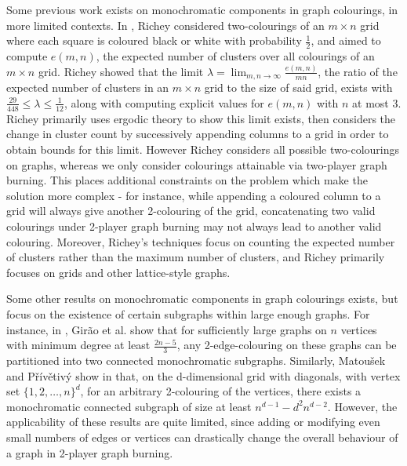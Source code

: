 \documentclass{mprop}
\begin{document}
Some previous work exists on monochromatic components in graph colourings, in more limited contexts. In \cite{richey_counting_nodate}, Richey considered two-colourings of an $m \times n$ grid where each square is coloured black or white with probability $\frac{1}{2}$, and aimed to compute $e(m,n)$, the expected number of clusters over all colourings of an $m \times n$ grid. Richey showed that the limit $\lambda = \lim_{m, n \rightarrow \infty} \frac{e(m, n)}{mn}$, the ratio of the expected number of clusters in an $m \times n$ grid to the size of said grid, exists with $\frac{29}{448} \leq \lambda \leq \frac{1}{12}$, along with computing explicit values for $e(m,n)$ with $n$ at most 3. Richey primarily uses ergodic theory to show this limit exists, then considers the change in cluster count by successively appending columns to a grid in order to obtain bounds for this limit. However Richey considers all possible two-colourings on graphs, whereas we only consider colourings attainable via two-player graph burning. This places additional constraints on the problem which make the solution more complex - for instance, while appending a coloured column to a grid will always give another 2-colouring of the grid, concatenating two valid colourings under 2-player graph burning may not always lead to another valid colouring. Moreover, Richey's techniques focus on counting the expected number of clusters rather than the maximum number of clusters, and Richey primarily focuses on grids and other lattice-style graphs.

Some other results on monochromatic components in graph colourings exists, but focus on the existence of certain subgraphs within large enough graphs. For instance, in \cite{girao_partitioning_2019}, Gir\~ao et al. show that for sufficiently large graphs on $n$ vertices with minimum degree at least $\frac{2n-5}{3}$, any 2-edge-colouring on these graphs can be partitioned into two connected monochromatic subgraphs. Similarly, Matou\v sek and P\v r\'iv\v etiv\'y show in \cite{matousek_large_2007} that, on the d-dimensional grid with diagonals, with vertex set $\{1,2,\dots,n\}^d$, for an arbitrary 2-colouring of the vertices, there exists a monochromatic connected subgraph of size at least $n^{d-1}-d^2n^{d-2}$. However, the applicability of these results are quite limited, since adding or modifying even small numbers of edges or vertices can drastically change the overall behaviour of a graph in 2-player graph burning. 
\end{document}
